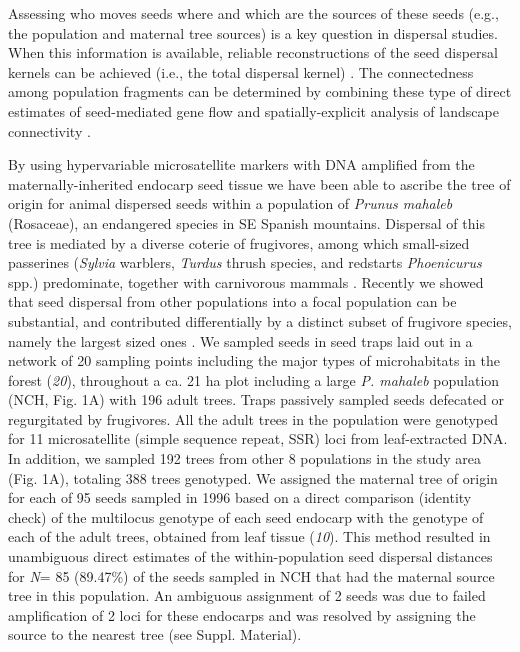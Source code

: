 \documentclass[a4paper,12pt]{article}
\begin{document}
\begin{bibunit}[science]
\begin{linenumbers}
\begin{spacing}{2}
Assessing who moves seeds where and which are the sources of these seeds (e.g., the population and maternal tree sources) is a key question in dispersal studies. When this information is available, reliable reconstructions of the seed dispersal kernels can be achieved (i.e., the total dispersal kernel) \citep{Nathan:2003qe,Jordano:2007a}. The connectedness among population fragments can be determined by combining these type of direct estimates of seed-mediated gene flow and spatially-explicit analysis of landscape connectivity \citep{Urban:2001}. 

By using hypervariable microsatellite markers with DNA amplified from the maternally-inherited endocarp seed tissue \citep{Godoy:2001} we have been able to ascribe the tree of origin for animal dispersed seeds within a population of \textit{Prunus mahaleb} (Rosaceae), an endangered species in SE Spanish mountains. Dispersal of this tree is mediated by a diverse coterie of frugivores, among which small-sized passerines (\textit{Sylvia} warblers, \textit{Turdus} thrush species, and redstarts \textit{Phoenicurus} spp.) predominate, together with carnivorous mammals \citep{Jordano:2000EcolMon}. Recently we showed that seed dispersal from other populations into a focal population can be substantial, and contributed differentially by a distinct subset of frugivore species, namely the largest sized ones \citep{Jordano:2007}.
We sampled seeds in seed traps laid out in a network of 20 sampling points including the major types of microhabitats in the forest (\textit{20}), throughout a ca. 21 ha plot including a large \textit{P. mahaleb} population (NCH, Fig. 1A) with 196 adult trees. Traps passively sampled seeds defecated or regurgitated by frugivores. All the adult trees in the population were genotyped for 11 microsatellite (simple sequence repeat, SSR) loci from leaf-extracted DNA. In addition, we sampled 192 trees from other 8 populations in the study area (Fig. 1A), totaling 388 trees genotyped. We assigned the maternal tree of origin for each of 95 seeds sampled in 1996 based on a direct comparison (identity check) of the multilocus genotype of each seed endocarp with the genotype of each of the adult trees, obtained from leaf tissue (\textit{10}). This method resulted in unambiguous direct estimates of the within-population seed dispersal distances for \textit{N}= 85 (89.47\%) of the seeds sampled in NCH that had the maternal source tree in this population. An ambiguous assignment of 2 seeds was due to failed amplification of 2 loci for these endocarps and was resolved by assigning the source to the nearest tree (see Suppl. Material).


\end{spacing}
\end{linenumbers}
\end{bibunit}
\end{document}
